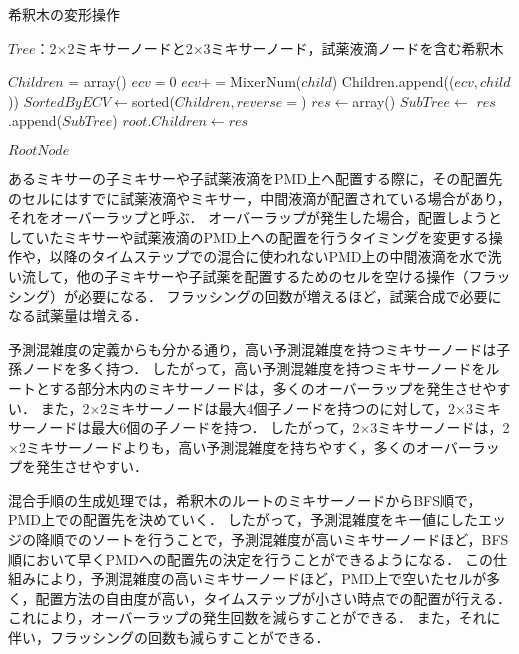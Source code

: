 \begin{algorithm}[tbp]
 \caption{希釈木の変形操作}\label{alg:transform}
 \begin{algorithmic}[1]
     \Require $\mathit{Tree}$：2$\times$2ミキサーノードと2$\times$3ミキサーノード，試薬液滴ノードを含む希釈木 

        \State $\mathit{Children}$ = array()
            \State $\mathit{ecv}=0$
                \State $\mathit{ecv}+=$MixerNum($child$) 
            \EndIf 
            \State Children.append(($\mathit{ecv,child}$))
        \EndFor 
        \State $\mathit{SortedByECV} \gets $sorted($Children,reverse=$\True)
        \State $\mathit{res}\gets$array()
            \State $\mathit{SubTree}\gets $
            \State $\mathit{res}$.append($\mathit{SubTree}$)
        \EndFor 
        \State $\mathit{root.Children}\gets \mathit{res}$ 

        \Return $\mathit{RootNode}$
    \EndFunction 

 \end{algorithmic}
\end{algorithm}
\newpage
あるミキサーの子ミキサーや子試薬液滴をPMD上へ配置する際に，その配置先のセルにはすでに試薬液滴やミキサー，中間液滴が配置されている場合があり，それをオーバーラップと呼ぶ．
オーバーラップが発生した場合，配置しようとしていたミキサーや試薬液滴のPMD上への配置を行うタイミングを変更する操作や，以降のタイムステップでの混合に使われないPMD上の中間液滴を水で洗い流して，他の子ミキサーや子試薬を配置するためのセルを空ける操作（フラッシング）が必要になる．
フラッシングの回数が増えるほど，試薬合成で必要になる試薬量は増える．

予測混雑度の定義からも分かる通り，高い予測混雑度を持つミキサーノードは子孫ノードを多く持つ．
したがって，高い予測混雑度を持つミキサーノードをルートとする部分木内のミキサーノードは，多くのオーバーラップを発生させやすい．
また，2$\times$2ミキサーノードは最大4個子ノードを持つのに対して，2$\times$3ミキサーノードは最大6個の子ノードを持つ．
したがって，2$\times$3ミキサーノードは，2$\times$2ミキサーノードよりも，高い予測混雑度を持ちやすく，多くのオーバーラップを発生させやすい．

混合手順の生成処理では，希釈木のルートのミキサーノードからBFS順で，PMD上での配置先を決めていく．
したがって，予測混雑度をキー値にしたエッジの降順でのソートを行うことで，予測混雑度が高いミキサーノードほど，BFS順において早くPMDへの配置先の決定を行うことができるようになる．
この仕組みにより，予測混雑度の高いミキサーノードほど，PMD上で空いたセルが多く，配置方法の自由度が高い，タイムステップが小さい時点での配置が行える．
これにより，オーバーラップの発生回数を減らすことができる．
また，それに伴い，フラッシングの回数も減らすことができる．

